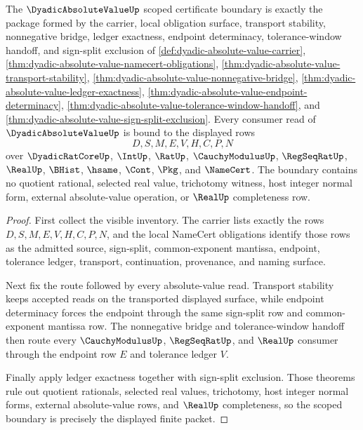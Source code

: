 \begin{theorem}
\label{thm:dyadic-absolute-value-scoped-certificate-boundary}
The $\DyadicAbsoluteValueUp$ scoped certificate boundary is exactly the package formed by the carrier, local obligation surface, transport stability, nonnegative bridge, ledger exactness, endpoint determinacy, tolerance-window handoff, and sign-split exclusion of \autoref{def:dyadic-absolute-value-carrier}, \autoref{thm:dyadic-absolute-value-namecert-obligations}, \autoref{thm:dyadic-absolute-value-transport-stability}, \autoref{thm:dyadic-absolute-value-nonnegative-bridge}, \autoref{thm:dyadic-absolute-value-ledger-exactness}, \autoref{thm:dyadic-absolute-value-endpoint-determinacy}, \autoref{thm:dyadic-absolute-value-tolerance-window-handoff}, and \autoref{thm:dyadic-absolute-value-sign-split-exclusion}. Every consumer read of $\DyadicAbsoluteValueUp$ is bound to the displayed rows
$$
D,S,M,E,V,H,C,P,N
$$
over $\DyadicRatCoreUp$, $\IntUp$, $\RatUp$, $\CauchyModulusUp$, $\RegSeqRatUp$, $\RealUp$, $\BHist$, $\hsame$, $\Cont$, $\Pkg$, and $\NameCert$. The boundary contains no quotient rational, selected real value, trichotomy witness, host integer normal form, external absolute-value operation, or $\RealUp$ completeness row.
\end{theorem}
\begin{proof}
First collect the visible inventory. The carrier lists exactly the rows $D,S,M,E,V,H,C,P,N$, and the local NameCert obligations identify those rows as the admitted source, sign-split, common-exponent mantissa, endpoint, tolerance ledger, transport, continuation, provenance, and naming surface.

Next fix the route followed by every absolute-value read. Transport stability keeps accepted reads on the transported displayed surface, while endpoint determinacy forces the endpoint through the same sign-split row and common-exponent mantissa row. The nonnegative bridge and tolerance-window handoff then route every $\CauchyModulusUp$, $\RegSeqRatUp$, and $\RealUp$ consumer through the endpoint row $E$ and tolerance ledger $V$.

Finally apply ledger exactness together with sign-split exclusion. Those theorems rule out quotient rationals, selected real values, trichotomy, host integer normal forms, external absolute-value rows, and $\RealUp$ completeness, so the scoped boundary is precisely the displayed finite packet.
\end{proof}

